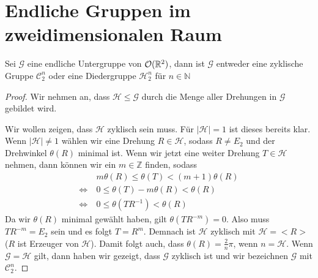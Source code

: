 \section{Endliche Gruppen im zweidimensionalen Raum}
\begin{theorem}
 Sei $\mathcal{G}$ eine endliche Untergruppe von ${\mathcal{O}(\mathbb{R}^2)}$, dann ist $\mathcal{G}$ entweder eine zyklische Gruppe $\mathcal{C}^n_2$ oder eine Diedergruppe $\mathcal{H}^n_2$ für $n \in \mathbb{N}$
\end{theorem}
\begin{proof}
 Wir nehmen an, dass $\mathcal{H} \leq \mathcal{G}$ durch die Menge aller Drehungen in $\mathcal{G}$ gebildet wird.
 
 Wir wollen zeigen, dass $\mathcal{H}$ zyklisch sein muss. Für $|\mathcal{H}|=1$ ist dieses bereits klar. Wenn $|\mathcal{H}| \neq 1$ wählen wir eine Drehung $R \in \mathcal{H}$, sodass $R \neq E_2$ und der Drehwinkel $\theta(R)$ minimal ist. Wenn wir jetzt eine weiter Drehung $T \in \mathcal{H}$ nehmen, dann können wir ein $m \in \mathbb{Z}$ finden, sodass \begin{align*}
        &m \theta(R)\leq\theta(T)<(m+1)\theta(R) \\
        \Leftrightarrow \ &0 \leq \theta(T)-m\theta(R)<\theta(R) \\
        \Leftrightarrow \ &0 \leq \theta(TR^{-1})<\theta(R)                                                                                                                                                                                                                                                                                                                                                           
\end{align*}
Da wir $\theta(R)$ minimal gewählt haben, gilt $\theta(TR^{-m})=0$. Also muss $TR^{-m}=E_2$ sein und es folgt $T=R^{m}$. Demnach ist $\mathcal{H}$ zyklisch mit $\mathcal{H}=<R>$ ($R$ ist Erzeuger von $\mathcal{H}$). Damit folgt auch, dass $\theta(R)=\frac{2}{n}\pi$, wenn $n=\mathcal{H}$. Wenn $\mathcal{G} = \mathcal{H}$ gilt, dann haben wir gezeigt, dass $\mathcal{G}$ zyklisch ist und wir bezeichnen $\mathcal{G}$ mit $\mathcal{C}^n_2$.


\end{proof}

